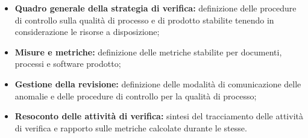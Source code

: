 \documentclass[../NormediProgetto.tex]{subfiles}
\begin{document}
\begin{itemize}
    \item \textbf{Quadro generale della strategia di verifica:} definizione delle procedure di controllo sulla qualità di processo e di prodotto stabilite tenendo in considerazione le risorse a disposizione;
    
    \item \textbf{Misure e metriche:} definizione delle metriche stabilite per documenti, processi e software prodotto;
    
    \item \textbf{Gestione della revisione:} definizione delle modalità di comunicazione delle anomalie e delle procedure di controllo per la qualità di processo;
    
    \item \textbf{Resoconto delle attività di verifica:} sintesi del tracciamento delle attività di verifica e rapporto sulle metriche calcolate durante le stesse.
\end{itemize}
\end{document}
